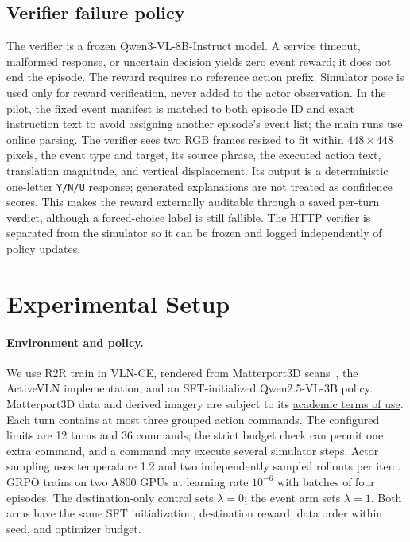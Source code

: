 \documentclass[10pt,twocolumn,letterpaper]{article}
\begin{document}
\subsection{Verifier failure policy}
The verifier is a frozen Qwen3-VL-8B-Instruct model. A service timeout, malformed response, or uncertain decision yields zero event reward; it does not end the episode. The reward requires no reference action prefix. Simulator pose is used only for reward verification, never added to the actor observation. In the pilot, the fixed event manifest is matched to both episode ID and exact instruction text to avoid assigning another episode's event list; the main runs use online parsing.
The verifier sees two RGB frames resized to fit within $448\times448$ pixels, the event type and target, its source phrase, the executed action text, translation magnitude, and vertical displacement. Its output is a deterministic one-letter \texttt{Y/N/U} response; generated explanations are not treated as confidence scores. This makes the reward externally auditable through a saved per-turn verdict, although a forced-choice label is still fallible. The HTTP verifier is separated from the simulator so it can be frozen and logged independently of policy updates.

\section{Experimental Setup}
\paragraph{Environment and policy.} We use R2R train in VLN-CE, rendered from Matterport3D scans~\cite{chang2017matterport3d}, the ActiveVLN implementation, and an SFT-initialized Qwen2.5-VL-3B policy. Matterport3D data and derived imagery are subject to its \href{https://kaldir.vc.cit.tum.de/matterport/MP_TOS.pdf}{academic terms of use}. Each turn contains at most three grouped action commands. The configured limits are 12 turns and 36 commands; the strict budget check can permit one extra command, and a command may execute several simulator steps. Actor sampling uses temperature 1.2 and two independently sampled rollouts per item. GRPO trains on two A800 GPUs at learning rate $10^{-6}$ with batches of four episodes. The destination-only control sets $\lambda=0$; the event arm sets $\lambda=1$. Both arms have the same SFT initialization, destination reward, data order within seed, and optimizer budget.
\end{document}
